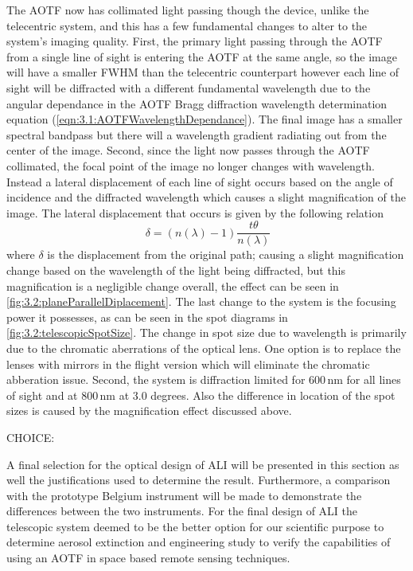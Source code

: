 \documentclass[12pt]{article}
\begin{document}
The AOTF now has collimated light passing though the device, unlike the telecentric system, and this has a few fundamental changes to alter to the system's imaging quality. First, the primary light passing through the AOTF from a single line of sight is entering the AOTF at the same angle, so the image will have a smaller FWHM than the telecentric counterpart however each line of sight will be diffracted with a different fundamental wavelength due to the angular dependance in the AOTF Bragg diffraction wavelength determination equation (\autoref{eqn:3.1:AOTFWavelengthDependance}). The final image has a smaller spectral bandpass but there will a wavelength gradient radiating out from the center of the image. Second, since the light now passes through the AOTF collimated, the focal point of the image no longer changes with wavelength. Instead a lateral displacement of each line of sight occurs based on the angle of incidence and the diffracted wavelength which causes a slight magnification of the image. The lateral displacement that occurs is given by the following relation
\begin{equation}
    \ \delta = (n(\lambda)-1)\frac{t\theta}{n(\lambda)}
    \label{eqn:3.2:planeParallelDiplacement}
\end{equation}
where $\delta$ is the displacement from the original path; causing a slight magnification change based on the wavelength of the light being diffracted, but this magnification is a negligible change overall, the effect can be seen in \autoref{fig:3.2:planeParallelDiplacement}. The last change to the system is the focusing power it possesses, as can be seen in the spot diagrams in \autoref{fig:3.2:telescopicSpotSize}. The change in spot size due to wavelength is primarily due to the chromatic aberrations of the optical lens. One option is to replace the lenses with mirrors in the flight version which will eliminate the chromatic abberation issue. Second, the system is diffraction limited for 600\,nm for all lines of sight and at 800\,nm at 3.0 degrees. Also the difference in location of the spot sizes is caused by the magnification effect discussed above.

CHOICE:

A final selection for the optical design of ALI will be presented in this section as well the justifications used to determine the result. Furthermore, a comparison with the prototype Belgium instrument will be made to demonstrate the differences between the two instruments. For the final design of ALI the telescopic system deemed to be the better option for our scientific purpose to determine aerosol extinction and engineering study to verify the capabilities of using an AOTF in space based remote sensing techniques.
\end{document}
